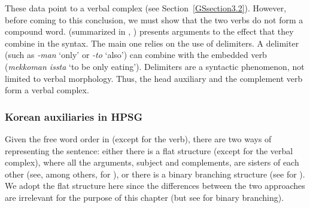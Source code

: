 \noindent
These data point to a verbal complex (see Section~\ref{GSsection3.2}). However, before coming to this conclusion, we must show that the two verbs do not form a compound word. \citet{no1991case} (summarized in \citealt{Chung98a-u}, \citealt{Kim2016a-u}) presents arguments to the effect that they combine in the syntax. The main one relies on the use of delimiters. A delimiter (such as \emph{-man} `only' or \emph{-to} `also') can combine with the embedded verb (\eg \emph{mekkoman issta} `to be only eating'). Delimiters are a syntactic phenomenon, not limited to verbal morphology. 
%
%	
Thus, the head auxiliary and the complement verb form a verbal complex.

\subsubsection{Korean auxiliaries in HPSG}\label{GSsection4.2.3}

Given the free word order in  (except for the verb), there are two ways of representing the sentence: either there is a flat structure (except for the verbal complex), where all the arguments, subject and complements, are sisters of each other (see, among others, \citealt{Chung98a-u} for ), or there is a binary branching structure (see \citealt{Kim2016a-u} for ). We adopt the flat structure here since the differences between the two approaches are irrelevant for the purpose of this chapter (but see  for binary branching).


